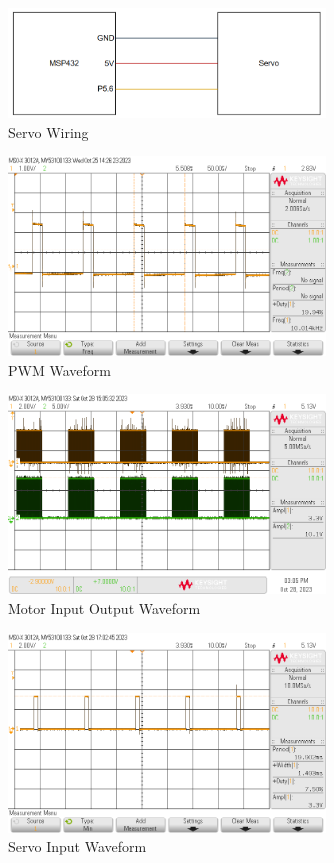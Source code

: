 \documentclass[CMPE]{KGCOEReport}
\begin{document}
\begin{figure}[H]
    \centering
    \includegraphics[width=0.75\textwidth]{ServoWiring.png}
    \caption{Servo Wiring}
    \label{fig:SevoWiring}
\end{figure}

\begin{figure}[H]
    \centering
    \includegraphics[width=0.75\textwidth]{PWM.png}
    \caption{PWM Waveform}
    \label{fig:pwm}
\end{figure}

\begin{figure}[H]
    \centering
    \includegraphics[width=0.75\textwidth]{MotorIO.png}
    \caption{Motor Input Output Waveform}
    \label{fig:motor}
\end{figure}

\begin{figure}[H]
    \centering
    \includegraphics[width=0.75\textwidth]{ServoWave.png}
    \caption{Servo Input Waveform}
    \label{fig:ServoWave}
\end{figure}
\end{document}
